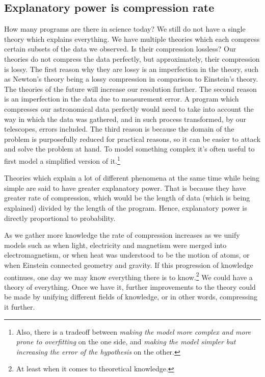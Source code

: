 \documentclass[oneside,hidelinks]{article}
\begin{document}
\newpage

\subsection{Explanatory power is compression rate}

How many programs are there in science today?
We still do not have a single theory which explains everything.
We have multiple theories which each compress certain subsets of the data we observed.
Is their compression lossless?
Our theories do not compress the data perfectly, but approximately, their compression is lossy.
The first reason why they are lossy is an imperfection in the theory, such as Newton's theory being a lossy compression in comparison to Einstein's theory.
The theories of the future will increase our resolution further.
The second reason is an imperfection in the data due to measurement error.
A program which compresses our astronomical data perfectly would need to take into account the way in which the data was gathered, and in such process transformed, by our telescopes, errors included.
The third reason is because the domain of the problem is purposefully reduced for practical reasons, so it can be easier to attack and solve the problem at hand.
To model something complex it's often useful to first model a simplified version of it.\footnote{Also, there is a tradeoff between \textit{making the model more complex and more prone to overfitting} on the one side, and \textit{making the model simpler but increasing the error of the hypothesis} on the other.}

Theories which explain a lot of different phenomena at the same time while being simple are said to have greater explanatory power.
That is because they have greater rate of compression, which would be the length of data (which is being explained) divided by the length of the program.
Hence, explanatory power is directly proportional to probability.

As we gather more knowledge the rate of compression increases as we unify models such as when light, electricity and magnetism were merged into electromagnetism, or when heat was understood to be the motion of atoms, or when Einstein connected geometry and gravity.
If this progression of knowledge continues, one day we may know everything there is to know.\footnote{At least when it comes to theoretical knowledge.}
We could have a theory of everything.
Once we have it, further improvements to the theory could be made by unifying different fields of knowledge, or in other words, compressing it further.
\end{document}
